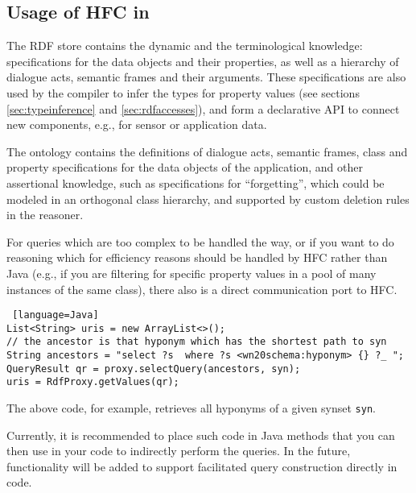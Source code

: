 \subsection{Usage of HFC in \vonda} \label{sec:hfc_usage}

The RDF store contains the dynamic and the terminological knowledge:
specifications for the data objects and their properties, as well as a
hierarchy of  dialogue acts,  semantic frames and their arguments. These
specifications are also used by the compiler to infer the types for property
values (see sections \ref{sec:typeinference} and \ref{sec:rdfaccesses}), and form a declarative API to
connect new components, e.g., for sensor or application data.

The ontology contains the definitions of dialogue acts, semantic frames, class
and property specifications for the data objects of the application, and other
assertional knowledge, such as specifications for ``forgetting'', which could
be modeled in an orthogonal class hierarchy, and supported by custom deletion
rules in the reasoner.

For queries which are too complex to be handled the \vonda way, or if you want to do reasoning which for efficiency reasons should be handled by HFC rather than Java (e.g., if you are filtering for specific property values in a pool of many instances of the same class), there also is a direct communication port to HFC.

\begin{lstlisting} [language=Java]
List<String> uris = new ArrayList<>();
// the ancestor is that hyponym which has the shortest path to syn
String ancestors = "select ?s  where ?s <wn20schema:hyponym> {} ?_ ";
QueryResult qr = proxy.selectQuery(ancestors, syn);
uris = RdfProxy.getValues(qr);
\end{lstlisting}

The above code, for example, retrieves all hyponyms of a given synset \texttt{syn}.

Currently, it is recommended to place such code in Java methods that you can then use in your \vonda code to indirectly perform the queries. In the future, functionality will be added to support facilitated query construction directly in \vonda code.
